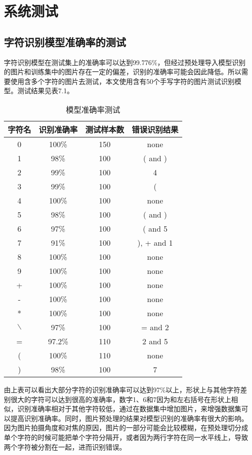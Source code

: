 \chapter{系统测试}
\section{字符识别模型准确率的测试}
字符识别模型在测试集上的准确率可以达到99.776\%，但经过预处理导入模型识别的图片和训练集中的图片存在一定的偏差，识别的准确率可能会因此降低。所以需要使用含多个字符的图片去测试，本文使用含有50个手写字符的图片测试识别模型。测试结果见表7.1。
\par
\begin{table}[h!]
\begin{center}
\caption{模型准确率测试}
\begin{tabular}{|c|c|c|c|}
 \hline
 字符名 & 识别准确率 & 测试样本数 & 错误识别结果\\
 \hline
0 & 100\% & 150 & none \\
 \hline
1 & 98\% & 100 & ( and ) \\
 \hline
2 & 99\% & 100 & 4 \\
 \hline
 3 & 99\% & 100 & ( \\
  \hline
 4 & 100\% & 100 & none \\
  \hline
 5 & 98\% & 100 & ( and ) \\
  \hline
 6 & 97\% & 100 & ( and 5 \\
  \hline
 7 & 91\% & 100 & ), + and 1 \\
  \hline
 8 & 100\% & 100 & none \\
  \hline
 9 & 100\% & 100 & none \\
  \hline
 + & 100\% & 100 & none \\
  \hline
 - & 100\% & 100 & none \\
  \hline
 * & 100\% & 100 & none \\
  \hline
$\backslash$ & 97\% & 100 & = and 2 \\
  \hline
 = & 97.2\% & 110 & 2 and 5 \\
  \hline
 ( & 100\% & 110 & none \\
  \hline
 ) & 98\% & 100 & 7 \\
  \hline
\end{tabular}
\end{center}
\end{table}
\par
由上表可以看出大部分字符的识别准确率可以达到97\%以上，形状上与其他字符差别很大的字符可以达到很高的准确率，数字1、6和7因为和左右括号在形状上相似，识别准确率相对于其他字符较低，通过在数据集中增加图片，来增强数据集可以提高识别准确率。同时，图片预处理的结果对模型识别的准确率有很大的影响。因为图片拍摄角度和对焦的原因，图片的一部分可能会比较模糊，在预处理切分成单个字符的时候可能把单个字符分隔开，或者因为两行字符在同一水平线上，导致两个字符被分割在一起，进而识别错误。


